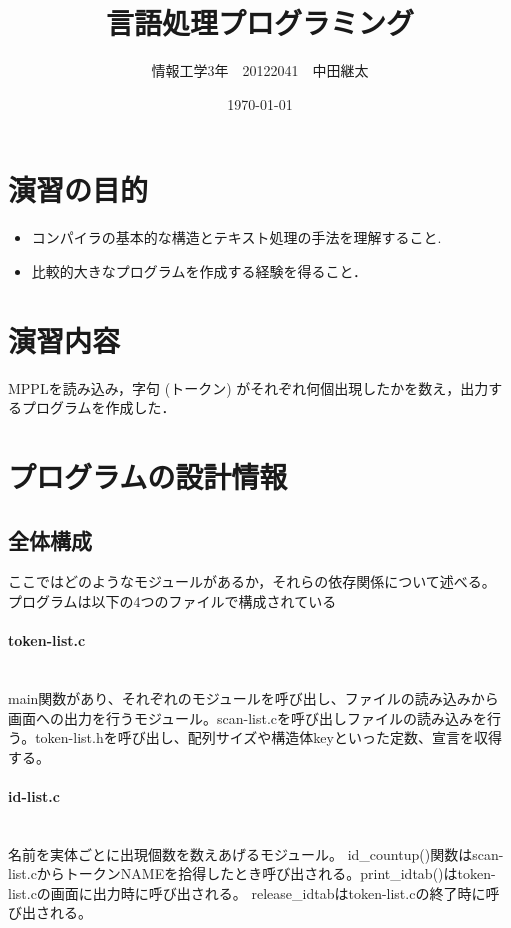 \documentclass[a4j]{jsarticle}
\title{言語処理プログラミング}
\author{情報工学3年　20122041　中田継太}
\date{\today}
\begin{document}
\maketitle
\clearpage
\setcounter{tocdepth}{3}
\tableofcontents
\clearpage

\section{演習の目的}
\begin{itemize}
  \item コンパイラの基本的な構造とテキスト処理の手法を理解すること.
  \item 比較的大きなプログラムを作成する経験を得ること．
\end{itemize}

\section{演習内容}
MPPLを読み込み，字句 (トークン) がそれぞれ何個出現したかを数え，出力するプログラムを作成した．

\section{プログラムの設計情報}
  \subsection{全体構成}
  ここではどのようなモジュールがあるか，それらの依存関係について述べる。\\
  プログラムは以下の4つのファイルで構成されている

    \paragraph{token-list.c}
    　\\
    main関数があり、それぞれのモジュールを呼び出し、ファイルの読み込みから画面への出力を行うモジュール。scan-list.cを呼び出しファイルの読み込みを行う。token-list.hを呼び出し、配列サイズや構造体keyといった定数、宣言を収得する。

    \paragraph{id-list.c}
    　\\
    名前を実体ごとに出現個数を数えあげるモジュール。
    id\_countup()関数はscan-list.cからトークンNAMEを拾得したとき呼び出される。print\_idtab()はtoken-list.cの画面に出力時に呼び出される。
    release\_idtabはtoken-list.cの終了時に呼び出される。
\end{document}
